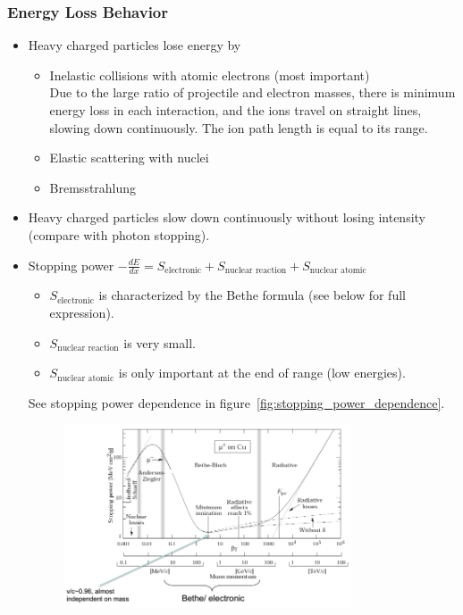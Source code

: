 \subsubsection{Energy Loss Behavior}
\begin{itemize}
    \item Heavy charged particles lose energy by
    \begin{itemize}
        \item Inelastic collisions with atomic electrons (most important)\\
         Due to the large ratio of projectile and electron masses, there is minimum energy loss in each interaction, and the ions travel on straight lines, slowing down continuously. The ion path length is equal to its range.
        \item Elastic scattering with nuclei
        \item Bremsstrahlung 
    \end{itemize}
    \item Heavy charged particles slow down continuously without losing intensity (compare with photon stopping).
    \item Stopping power $-\frac{dE}{dx}=S_{\text{electronic}}+S_{\text{nuclear reaction}}+S_{\text{nuclear atomic}}$
    \begin{itemize}
        \item $S_{\text{electronic}}$ is characterized by the Bethe formula (see below for full expression).
        \item $S_{\text{nuclear reaction}}$ is very small.
        \item $S_{\text{nuclear atomic}}$ is only important at the end of range (low energies).
    \end{itemize}
    See stopping power dependence in figure~\ref{fig:stopping_power_dependence}.
    \begin{figure}[ht]
        \centering
        \includegraphics[width=0.8\textwidth]{images/stopping_power_dependence.png}

\end{figure}
\end{itemize}
